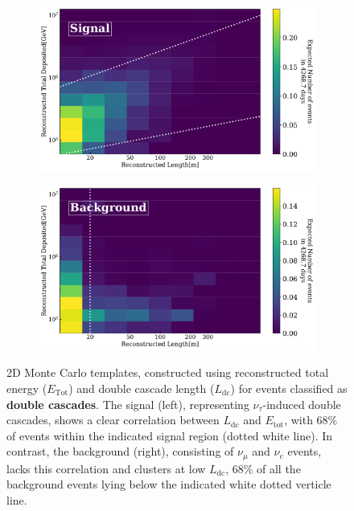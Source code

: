 \begin{figure}[h!]
    \begin{subfigure}[h]{0.72\textwidth}
        \includegraphics{./figures/Analysis/LvsE_signal.pdf}
    \end{subfigure}
    \hfill
    \begin{subfigure}[h]{0.72\textwidth}
        \includegraphics{./figures/Analysis/LvsE_Bkg.pdf}
       
    \end{subfigure}%
    \caption[Correlation of total deposited energy and length in 2D MC PDF, for signal and background double cascades]{2D Monte Carlo templates, constructed using reconstructed total energy ($E_{\text{Tot}}$) and double cascade length ($L_{\text{dc}}$) for events classified as \textbf{double cascades}. The signal (left), representing $\nu_\tau$-induced double cascades, shows a clear correlation between $L_{\text{dc}}$ and $E_{\text{tot}}$, with 68\% of events within the indicated signal region (dotted white line). In contrast, the background (right), consisting of $\nu_\mu$ and $\nu_e$ events, lacks this correlation and clusters at low $L_{\text{dc}}$, 68\% of all the background events lying below the indicated white dotted verticle line.}
\end{figure}

